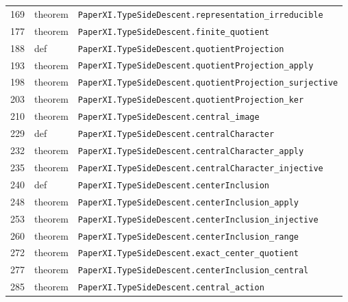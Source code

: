 \documentclass[10pt,oneside]{book}
\begin{document}
\begin{longtable}{@{}p{}p{}p{}@{}}
169&theorem&\nolinkurl{PaperXI.TypeSideDescent.representation_irreducible}\\

177&theorem&\nolinkurl{PaperXI.TypeSideDescent.finite_quotient}\\

188&def&\nolinkurl{PaperXI.TypeSideDescent.quotientProjection}\\

193&theorem&\nolinkurl{PaperXI.TypeSideDescent.quotientProjection_apply}\\

198&theorem&\nolinkurl{PaperXI.TypeSideDescent.quotientProjection_surjective}\\

203&theorem&\nolinkurl{PaperXI.TypeSideDescent.quotientProjection_ker}\\

210&theorem&\nolinkurl{PaperXI.TypeSideDescent.central_image}\\

229&def&\nolinkurl{PaperXI.TypeSideDescent.centralCharacter}\\

232&theorem&\nolinkurl{PaperXI.TypeSideDescent.centralCharacter_apply}\\

235&theorem&\nolinkurl{PaperXI.TypeSideDescent.centralCharacter_injective}\\

240&def&\nolinkurl{PaperXI.TypeSideDescent.centerInclusion}\\

248&theorem&\nolinkurl{PaperXI.TypeSideDescent.centerInclusion_apply}\\

253&theorem&\nolinkurl{PaperXI.TypeSideDescent.centerInclusion_injective}\\

260&theorem&\nolinkurl{PaperXI.TypeSideDescent.centerInclusion_range}\\

272&theorem&\nolinkurl{PaperXI.TypeSideDescent.exact_center_quotient}\\

277&theorem&\nolinkurl{PaperXI.TypeSideDescent.centerInclusion_central}\\

285&theorem&\nolinkurl{PaperXI.TypeSideDescent.central_action}\\

\bottomrule\end{longtable}
\end{document}
